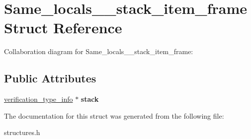 \hypertarget{structSame__locals__1__stack__item__frame}{}\section{Same\+\_\+locals\+\_\+\_\+stack\+\_\+item\+\_\+frame Struct Reference}
\label{structSame__locals__1__stack__item__frame}


Collaboration diagram for Same\+\_\+locals\+\_\+\_\+stack\+\_\+item\+\_\+frame\+:
\subsection*{Public Attributes}
\begin{DoxyCompactItemize}
\item 
\hyperlink{structverification__type__info}{verification\+\_\+type\+\_\+info} $\ast$ {\bfseries stack}\hypertarget{structSame__locals__1__stack__item__frame_aea334c9e9f4e42aad07a6ec10a7f058a}{}\label{structSame__locals__1__stack__item__frame_aea334c9e9f4e42aad07a6ec10a7f058a}

\end{DoxyCompactItemize}


The documentation for this struct was generated from the following file\+:\begin{DoxyCompactItemize}
\item 
structures.\+h\end{DoxyCompactItemize}
